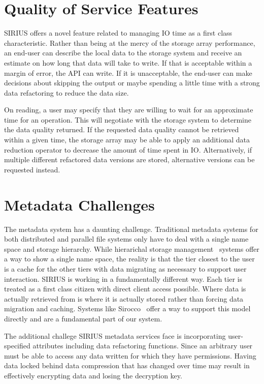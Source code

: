 \documentclass[letterpaper,twocolumn,10pt]{article}
\begin{document}
\section{Quality of Service Features}
\label{sec:qos}

SIRIUS offers a novel feature related to managing IO time as a first class
characteristic. Rather than being at the mercy of the storage array
performance, an end-user can describe the local data to the storage system and
receive an estimate on how long that data will take to write. If that is
acceptable within a margin of error, the API can write. If it is unacceptable,
the end-user can make decisions about skipping the output or maybe spending a
little time with a strong data refactoring to reduce the data size.

On reading, a user may specify that they are willing to wait for an approximate
time for an operation. This will negotiate with the storage system to determine
the data quality returned. If the requested data quality cannot be retrieved
within a given time, the storage array may be able to apply an additional
data reduction operator to decrease the amount of time spent in IO.
Alternatively, if multiple different refactored data versions are stored,
alternative versions can be requested instead.

\section{Metadata Challenges}
\label{sec:metadata}

The metadata system has a daunting challenge. Traditional metadata systems for
both distributed and parallel file systems only have to deal with a single name
space and storage hierarchy. While hierarichal storage management~\cite{blaze:1992:hsm}
systems offer a way to show a single name space, the reality is that the tier
closest to the user is a cache for the other tiers with data migrating as
necessary to support user interaction. SIRIUS is working in a fundamentally
different way. Each tier is treated as a first class citizen with direct
client access possible. Where data is actually retrieved from is where it is
actually stored rather than forcing data migration and caching. Systems like
Sirocco~\cite{curry:2015:sirocco} offer a way to support this model directly and are a
fundamental part of our system.

The additional challege SIRIUS metadata services face is incorporating
user-specified attributes including data refactoring functions. Since an
arbitrary user must be able to access any data written for which they have
permissions. Having data locked behind data compression that has changed over
time may result in effectively encrypting data and losing the decryption key.
\end{document}
